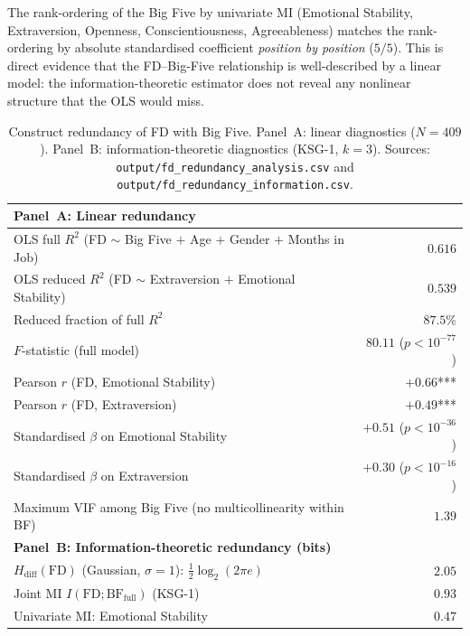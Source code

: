 \documentclass[11pt,a4paper]{article}
\begin{document}
The rank-ordering of the Big Five by univariate MI (Emotional
Stability, Extraversion, Openness, Conscientiousness, Agreeableness)
matches the rank-ordering by absolute standardised coefficient
\emph{position by position} ($5/5$). This is direct evidence that
the FD--Big-Five relationship is well-described by a linear model:
the information-theoretic estimator does not reveal any nonlinear
structure that the OLS would miss.

\begin{table}[h!]
\centering
\caption{Construct redundancy of FD with Big Five. Panel~A: linear
diagnostics ($N=409$). Panel~B: information-theoretic diagnostics
(KSG-1, $k=3$). Sources:
\texttt{output/fd\_redundancy\_analysis.csv} and
\texttt{output/fd\_redundancy\_information.csv}.}
\label{tab:redundancy}
\begin{tabular}{lr}
\toprule
\multicolumn{2}{l}{\textbf{Panel~A: Linear redundancy}} \\
\midrule
OLS full $R^2$ (FD $\sim$ Big Five $+$ Age $+$ Gender $+$ Months in Job) & $0.616$ \\
OLS reduced $R^2$ (FD $\sim$ Extraversion $+$ Emotional Stability)        & $0.539$ \\
Reduced fraction of full $R^2$                                            & $87.5\%$ \\
$F$-statistic (full model)                                                & $80.11$ ($p<10^{-77}$) \\
Pearson $r$ (FD, Emotional Stability)                                     & $+0.66$*** \\
Pearson $r$ (FD, Extraversion)                                            & $+0.49$*** \\
Standardised $\beta$ on Emotional Stability                               & $+0.51$ ($p<10^{-36}$) \\
Standardised $\beta$ on Extraversion                                      & $+0.30$ ($p<10^{-16}$) \\
Maximum VIF among Big Five (no multicollinearity within BF)               & $1.39$ \\
\midrule
\multicolumn{2}{l}{\textbf{Panel~B: Information-theoretic redundancy (bits)}} \\
\midrule
$H_{\text{diff}}(\text{FD})$ (Gaussian, $\sigma=1$): $\tfrac{1}{2}\log_2(2\pi e)$ & $2.05$ \\
Joint MI $I(\text{FD}; \text{BF}_{\text{full}})$ (KSG-1)                          & $0.93$ \\
Univariate MI: Emotional Stability                                                & $0.47$ \\

\end{tabular}
\end{table}
\end{document}
